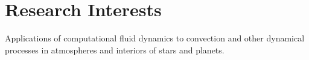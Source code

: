 \section{Research Interests}

Applications of computational fluid dynamics to convection and other dynamical processes in atmospheres and interiors of stars and planets.

